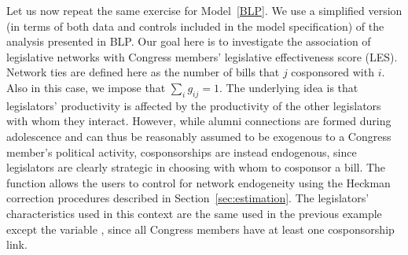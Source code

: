 \documentclass[nojss]{jss}
\begin{document}
Let us now repeat the same exercise for Model~\ref{BLP}.  We use a
simplified version (in terms of both data and controls included in the model
specification) of the analysis presented in BLP.  Our goal here is to
investigate the association of legislative networks with Congress members'
legislative effectiveness score (LES).  Network ties are defined here as the
number of bills that $j$ cosponsored with $i$.  Also in this case, we impose
that $\sum_{i}g_{ij}=1$.  The underlying idea is that legislators'
productivity is affected by the productivity of the other legislators with
whom they interact.  However, while alumni connections are formed during
adolescence and can thus be reasonably assumed to be exogenous to a Congress
member's political activity, cosponsorships are instead endogenous, since
legislators are clearly strategic in choosing with whom to cosponsor a bill. 
The function  allows the users to control for network
endogeneity using the Heckman correction procedures described in Section~\ref{sec:estimation}.
The legislators' characteristics used in this context
are the same used in the previous example except the variable
, since all Congress members have at least one cosponsorship
link.
%
\end{document}

